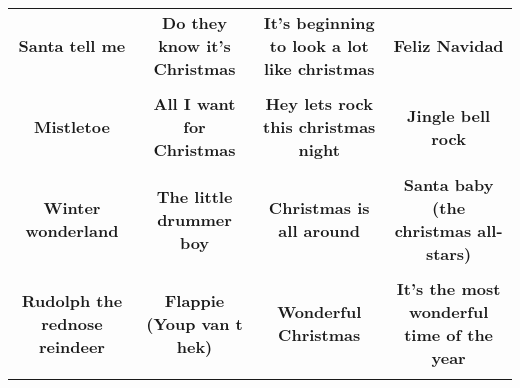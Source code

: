 \documentclass[12pt]{article} \usepackage{eso-pic, graphicx}
\newcommand{\background}[1]{%
\AddToShipoutPictureBG*{\texttt{[image: \#1]}}
}
\begin{document}
\tabcolsep=30.2pt \renewcommand{\arraystretch}{4.5}   \vspace*{4.3cm} \begin{center}  \begin{tabular}{c c c c}
\parbox{3cm}{\centering \textbf{Santa tell me}}& 
\parbox{3cm}{\centering \textbf{Do they know it's Christmas}}& 
\parbox{3cm}{\centering \textbf{It’s beginning to look a lot like christmas}}& 
\parbox{3cm}{\centering \textbf{Feliz Navidad}}\\ \\ 
\parbox{3cm}{\centering \textbf{Mistletoe}}& 
\parbox{3cm}{\centering \textbf{All I want for Christmas}}& 
\parbox{3cm}{\centering \textbf{Hey lets rock this christmas night}}& 
\parbox{3cm}{\centering \textbf{Jingle bell rock}}\\ \\ 
\parbox{3cm}{\centering \textbf{Winter wonderland}}& 
\parbox{3cm}{\centering \textbf{The little drummer boy}}& 
\parbox{3cm}{\centering \textbf{Christmas is all around}}& 
\parbox{3cm}{\centering \textbf{Santa baby (the christmas all-stars)}}\\ \\ 
\parbox{3cm}{\centering \textbf{Rudolph the rednose reindeer}}& 
\parbox{3cm}{\centering \textbf{Flappie (Youp van t hek)}}& 
\parbox{3cm}{\centering \textbf{Wonderful Christmas}}& 
\parbox{3cm}{\centering \textbf{It’s the most wonderful time of the year}}\\ \\ 
\end{tabular} \background{discobingo.pdf} \end{center} 
\end{document}
